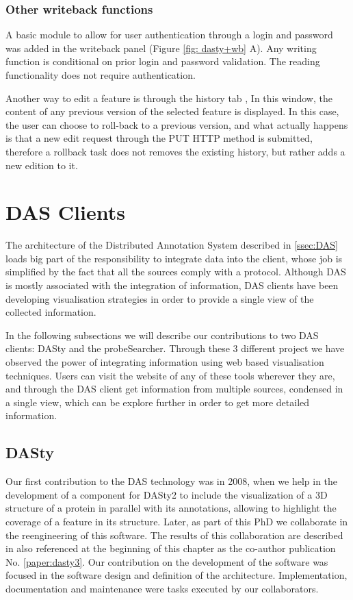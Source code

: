 \subsubsection{Other writeback functions}
A basic module to allow for user authentication through a login and password was added in the writeback panel (Figure \ref{fig: dasty+wb} A). Any writing function is conditional on prior login and password validation. The reading functionality does not require authentication.

Another way to edit a feature is through the history tab , In this window, the content of any previous version of the selected feature is displayed. In this case, the user can choose to roll-back to a previous version, and what actually happens is that a new edit request through the PUT HTTP method is submitted, therefore a rollback task does not removes the existing history, but rather adds a new edition to it.




	
\section{DAS Clients} \label{section:dasvisual}
The architecture of the Distributed Annotation System described in \ref{ssec:DAS} loads big part of the responsibility to integrate data into the client, whose job is simplified by the fact that all the sources comply with a protocol. Although DAS is mostly associated with the integration of information, DAS clients have been developing visualisation strategies in order to provide a single view of the collected information.

In the following subsections we will describe our contributions to two DAS clients: DASty and the probeSearcher. Through these 3 different project we have observed the power of integrating information using web based visualisation techniques. Users can visit the website of any of these tools wherever they are, and through the DAS client get information from multiple sources, condensed in a single view, which can be explore further in order to get more detailed information.

\subsection{DASty} \label{section:dasty}
Our first contribution to the DAS technology was in 2008, when we help in the development of a component for DASty2 to include the visualization of a 3D structure of a protein in parallel with its annotations, allowing to highlight the coverage of a feature in its structure. Later, as part of this PhD we collaborate in the reengineering of this software. The results of this collaboration are described in \cite{VIL2011} also referenced at the beginning of this chapter as the co-author publication No. \ref{paper:dasty3}. Our contribution on the development of the software was focused in the software design and definition of the architecture. Implementation, documentation and maintenance were tasks executed by our collaborators. 

